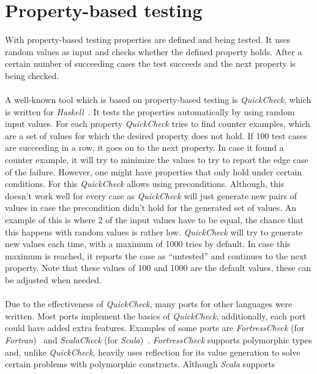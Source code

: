 \section{Property-based testing}
With property-based testing properties are defined and being tested. It uses random values as input and checks whether the defined property holds. After a certain number of succeeding cases the test succeeds and the next property is being checked.\\
\\
A well-known tool which is based on property-based testing is
\textit{QuickCheck}, which is written for
\textit{Haskell}~\cite{claessen2011quickcheck}. It tests the properties
automatically by using random input values. For each property
\textit{QuickCheck} tries to find counter examples, which are a set of values
for which the desired property does not hold. If 100 test cases are succeeding
in a row, it goes on to the next property. In case it found a counter example,
it will try to minimize the values to try to report the edge case of the
failure. However, one might have properties that only hold under certain
conditions. For this \textit{QuickCheck} allows using preconditions. Although,
this doesn't work well for every case as \textit{QuickCheck} will just generate
new pairs of values in case the precondition didn't hold for the generated set
of values. An example of this is where 2 of the input values have to be equal,
the chance that this happens with random values is rather low.
\textit{QuickCheck} will try to generate new values each time, with a maximum of
1000 tries by default. In case this maximum is reached, it reports the case as
``untested'' and continues to the next property. Note that these values of 100 and
1000 are the default values, these can be adjusted when needed.\\
\\
Due to the effectiveness of \textit{QuickCheck}, many ports for other languages
were written. Most ports implement the basics of \textit{QuickCheck},
additionally, each port could have added extra features. Examples of some ports
are \textit{FortressCheck} (for \textit{Fortran})~\cite{kang2011fortresscheck}
and \textit{ScalaCheck} (for \textit{Scala})~\cite{siteScalaCheck2015}.
\textit{FortressCheck} supports polymorphic types and, unlike
\textit{QuickCheck}, heavily uses reflection for its value generation to solve
certain problems with polymorphic constructs. Although \textit{Scala} supports
